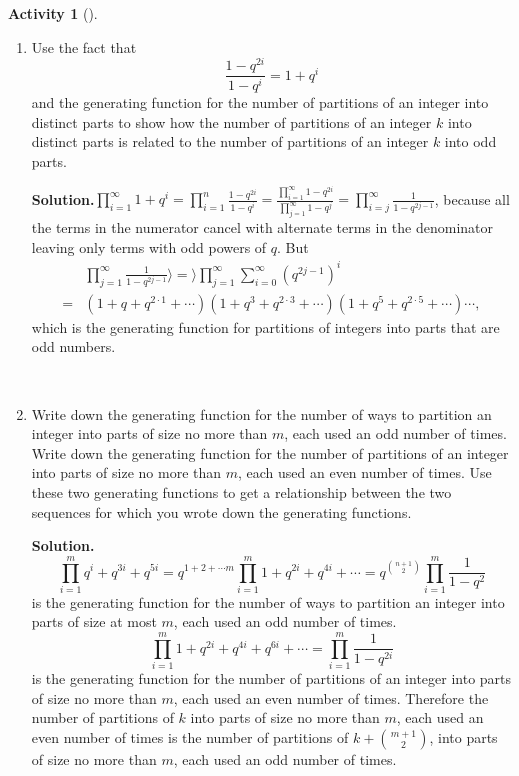 \documentclass[10pt,]{book}
\theoremstyle{plain}
\theoremstyle{definition}
\newtheorem{activity}[project]{Activity}
\numberwithin{equation}{chapter}
\newcommand{\amp}{&}
\begin{document}
\begin{activity}[]\label{activity-181}
~\par
\begin{enumerate}[label=(\alph*)]
 \item Use the fact that%
\begin{equation*}
\frac{1-q^{2i}}{1-q^i}= 1+q^i
\end{equation*}
and the generating function for the number of partitions of an integer into distinct parts to show how the number of partitions of an integer \(k\) into distinct parts is related to the number of partitions of an integer \(k\) into odd parts.%
\par\medskip\noindent%
\textbf{Solution.}\quad \(\displaystyle\prod_{i=1}^\infty 1+q^i=\prod_{i=1}^n \frac{1-q^{2i}}{1-q^i}=\frac{\prod_{i=1}^\infty1-q^{2i}}{\prod_{j=1}^\infty 1-q^j}
=\prod_{i=j}^\infty \frac{1}{1-q^{2j-1}}\), because all the terms in the numerator cancel with alternate terms in the denominator leaving only terms with odd powers of \(q\). But%
\begin{align*}
\amp \prod_{j=1}^\infty\frac{1}{1-q^{2j-1}}\rangle =\rangle \prod_{j=1}^\infty
\sum_{i=0}^\infty
(q^{2j-1})^i\\
=\amp (1+q+q^{2\cdot1}+\cdots)(1+q^3+q^{2\cdot3}+\cdots)(1
+q^5+q^{2\cdot5}+\cdots)\cdots,
\end{align*}
which is the generating function for partitions of integers into parts that are odd numbers.%

~\par
\item Write down the generating function for the number of ways to partition an integer into parts of size no more than \(m\), each used an odd number of times. Write down the generating function for the number of partitions of an integer into parts of size no more than \(m\), each used an even number of times. Use these two generating functions to get a relationship between the two sequences for which you wrote down the generating functions.%
\par\medskip\noindent%
\textbf{Solution.}\quad %
\begin{equation*}
\displaystyle\prod_{i=1}^m q^i+q^{3i}+q^{5i}= q^{1+2+\cdots
m}\prod_{i=1}^m 1+q^{2i}+q^{4i}+\cdots=q^\binom{n+1}{2}\prod_{i=1}^m\frac{1}{1-q^2}
\end{equation*}
is the generating function for the number of ways to partition an integer into parts of size at most \(m\), each used an odd number of times.%
\begin{equation*}
\displaystyle
\prod_{i=1}^m 1 +q^{2i}+q^{4i}+q^{6i}+\cdots=\prod_{i=1}^m \frac{1}{1-q^{2i}}
\end{equation*}
is the generating function for the number of partitions of an integer into parts of size no more than \(m\), each used an even number of times. Therefore the number of partitions of \(k\) into parts of size no more than \(m\), each used an even number of times is the number of partitions of \(k+\binom{m+1}{2}\), into parts of size no more than \(m\), each used an odd number of times.%

\end{enumerate}
\end{activity}
\end{document}

